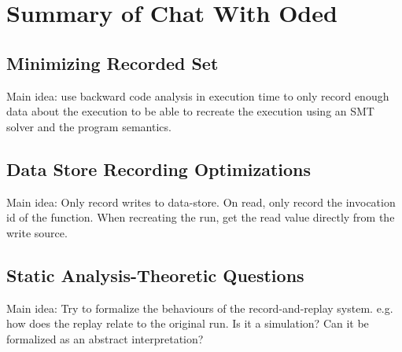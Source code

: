 \section{Summary of Chat With Oded}

\subsection{Minimizing Recorded Set}
Main idea: use backward code analysis in execution time to only record enough
data about the execution to be able to recreate the execution using an SMT
solver and the program semantics.

\subsection{Data Store Recording Optimizations}
Main idea: Only record writes to data-store. On read, only record the invocation
id of the function. When recreating the run, get the read value directly from
the write source.

\subsection{Static Analysis-Theoretic Questions}
Main idea: Try to formalize the behaviours of the record-and-replay system. e.g.
how does the replay relate to the original run. Is it a simulation? Can it be
formalized as an abstract interpretation?

